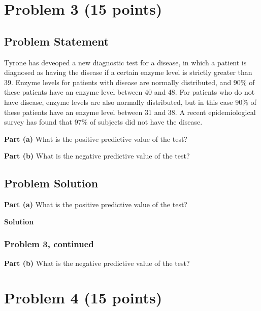 \documentclass[12pt]{article}
\theoremstyle{definition}
\begin{document}
\newpage
\section*{Problem 3 (15 points)}

\subsection*{Problem Statement}

Tyrone has deveoped a new diagnostic test for a disease, in which a patient is diagnosed as having the disease if a certain enzyme level is strictly greater than 39. Enzyme levels for patients with disease are normally distributed, and 90\% of these patients have an enzyme level between 40 and 48. For patients who do not have disease, enzyme levels are also normally distributed, but in this case 90\% of these patients have an enzyme level between 31 and 38. A recent epidemiological survey has found that 97\% of subjects did not have the disease.

\bigskip
\noindent
{\bf Part (a)} What is the positive predictive value of the test?

\bigskip
\noindent
{\bf Part (b)} What is the negative predictive value of the test?



\subsection*{Problem Solution}

\noindent
{\bf Part (a)} What is the positive predictive value of the test?

\bigskip
\noindent
{\bf Solution} 

\newpage
\subsubsection*{Problem 3, continued}

\vspace{2in}
\noindent
{\bf Part (b)} What is the negative predictive value of the test?









\newpage
\section*{Problem 4 (15 points)}
\end{document}
